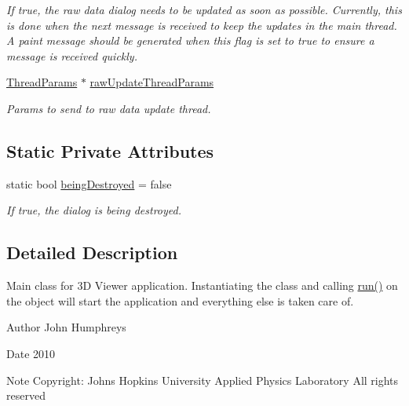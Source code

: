 \begin{DoxyCompactItemize}
\begin{DoxyCompactList}\small\item\em If true, the raw data dialog needs to be updated as soon as possible. Currently, this is done when the next message is received to keep the updates in the main thread. A paint message should be generated when this flag is set to true to ensure a message is received quickly. \end{DoxyCompactList}\item 
\hypertarget{class_three_d_viewer_abecd5783691d6035fbcd044009f7116d}{
\hyperlink{struct_thread_params}{ThreadParams} $\ast$ \hyperlink{class_three_d_viewer_abecd5783691d6035fbcd044009f7116d}{rawUpdateThreadParams}}
\label{class_three_d_viewer_abecd5783691d6035fbcd044009f7116d}

\begin{DoxyCompactList}\small\item\em Params to send to raw data update thread. \end{DoxyCompactList}\end{DoxyCompactItemize}
\subsection*{Static Private Attributes}
\begin{DoxyCompactItemize}
\item 
\hypertarget{class_three_d_viewer_a45094fa7bc89699d13d425e301fbafe7}{
static bool \hyperlink{class_three_d_viewer_a45094fa7bc89699d13d425e301fbafe7}{beingDestroyed} = false}
\label{class_three_d_viewer_a45094fa7bc89699d13d425e301fbafe7}

\begin{DoxyCompactList}\small\item\em If true, the dialog is being destroyed. \end{DoxyCompactList}\end{DoxyCompactItemize}


\subsection{Detailed Description}
Main class for 3D Viewer application. Instantiating the class and calling \hyperlink{class_three_d_viewer_af0d2688c26f061516c739c4ebe5fdb62}{run()} on the object will start the application and everything else is taken care of. 

\begin{DoxyAuthor}{Author}
John Humphreys 
\end{DoxyAuthor}
\begin{DoxyDate}{Date}
2010 
\end{DoxyDate}
\begin{DoxyNote}{Note}
Copyright: Johns Hopkins University Applied Physics Laboratory All rights reserved 
\end{DoxyNote}


